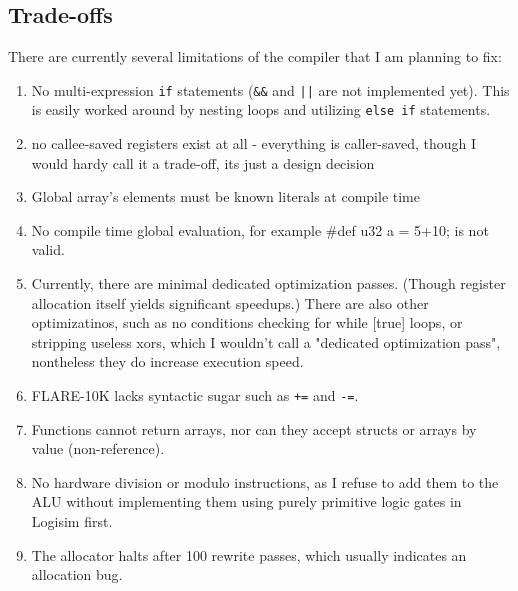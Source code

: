 \documentclass{article}
\begin{document}
\subsection{Trade-offs}
There are currently several limitations of the compiler that I am planning to fix:
\begin{enumerate}
    \item No multi-expression \texttt{if} statements (\texttt{\&\&} and \texttt{||} are not implemented yet). This is easily worked around by nesting loops and utilizing \texttt{else if} statements.
    \item no callee-saved registers exist at all - everything is caller-saved, though I would hardy call it a trade-off, its just a design decision
    \item Global array's elements must be known literals at compile time
    \item No compile time global evaluation, for example $\#$def u32 a = 5+10; is not valid.
    \item Currently, there are minimal dedicated optimization passes. (Though register allocation itself yields significant speedups.) There are also other optimizatinos, such as no conditions checking for while [true] loops, or stripping useless xors, which I wouldn't call a "dedicated optimization pass", nontheless they do increase execution speed.
    \item FLARE-10K lacks syntactic sugar such as \texttt{+=} and \texttt{-=}.
    \item Functions cannot return arrays, nor can they accept structs or arrays by value (non-reference).
    \item No hardware division or modulo instructions, as I refuse to add them to the ALU without implementing them using purely primitive logic gates in Logisim first.
    \item The allocator halts after 100 rewrite passes, which usually indicates an allocation bug.
\end{enumerate}
\end{document}
